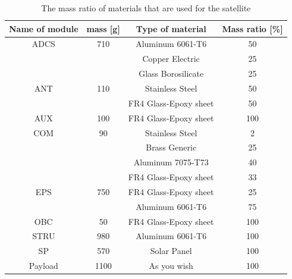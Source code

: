 \documentclass[12pt, a4paper,titlepage]{article}
\numberwithin{equation}{section}
\numberwithin{figure}{section}
\begin{document}
\begin{table}
\begin{center}
\begin{tabular}{ |c|c|c|c|} 
 \hline
 Name of module & mass [g] & Type of material & Mass ratio [\%]\\\hline
 ADCS &	710	& Aluminum 6061-T6 &	50\\
			& & Copper Electric	& 25 \\
			& &  Glass Borosilicate 	& 25\\\hline
ANT		&  110		& Stainless Steel 	& 50\\
		&  & FR4 Glass-Epoxy sheet	& 50\\\hline
AUX		& 100	& 	FR4 Glass-Epoxy sheet	& 100\\\hline
COM	& 	90	& 	Stainless Steel 	& 2\\
			& 	& Brass Generic		& 25\\
			& 	& Aluminum 7075-T73		& 40\\
			& 	& FR4 Glass-Epoxy sheet	& 	33\\\hline
EPS	& 	750	& 	FR4 Glass-Epoxy sheet		& 25\\
			& 	& Aluminum 6061-T6		& 75\\\hline
OBC	&	50		& FR4 Glass-Epoxy sheet	& 	100\\\hline
STRU	& 	980		& Aluminum 6061-T6	& 	100\\\hline
SP	& 	570		& Solar Panel	& 	100\\\hline
Payload	& 	1100	& 	As you wish	& 	100\\
 \hline
\end{tabular}
\end{center}
\caption{The mass ratio of materials that are used for the satellite}
\end{table}
\end{document}
